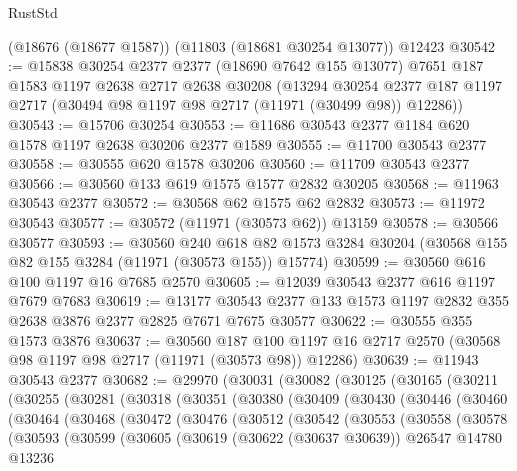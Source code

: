 \begin{lexlean}{RustStd}
\begin{coremodule}
    (@18676 (@18677 @1587))
    (@11803 (@18681 @30254 @13077))
    @12423
@30542 := @15838
    @30254
    @2377
    @2377
    (@18690 @7642 @155 @13077)
    @7651
    @187
    @1583
    @1197
    @2638
    @2717
    @2638
    @30208
    (@13294 @30254 @2377 @187 @1197 @2717 (@30494 @98 @1197 @98 @2717 (@11971 (@30499 @98)) @12286))
@30543 := @15706 @30254
@30553 := @11686 @30543 @2377 @1184 @620 @1578 @1197 @2638 @30206 @2377 @1589
@30555 := @11700 @30543 @2377
@30558 := @30555 @620 @1578 @30206
@30560 := @11709 @30543 @2377
@30566 := @30560 @133 @619 @1575 @1577 @2832 @30205
@30568 := @11963 @30543 @2377
@30572 := @30568 @62 @1575 @62 @2832
@30573 := @11972 @30543
@30577 := @30572 (@11971 (@30573 @62)) @13159
@30578 := @30566 @30577
@30593 := @30560
    @240
    @618
    @82
    @1573
    @3284
    @30204
    (@30568 @155 @82 @155 @3284 (@11971 (@30573 @155)) @15774)
@30599 := @30560 @616 @100 @1197 @16 @7685 @2570
@30605 := @12039 @30543 @2377 @616 @1197 @7679 @7683
@30619 := @13177 @30543 @2377 @133 @1573 @1197 @2832 @355 @2638 @3876 @2377 @2825 @7671 @7675 @30577
@30622 := @30555 @355 @1573 @3876
@30637 := @30560
    @187
    @100
    @1197
    @16
    @2717
    @2570
    (@30568 @98 @1197 @98 @2717 (@11971 (@30573 @98)) @12286)
@30639 := @11943 @30543 @2377
@30682 := @29970
    (@30031
      (@30082
        (@30125
          (@30165
            (@30211
              (@30255
                (@30281
                  (@30318
                    (@30351
                      (@30380
                        (@30409
                          (@30430
                            (@30446
                              (@30460
                                (@30464
                                  (@30468
                                    (@30472
                                      (@30476
                                        (@30512
                                          (@30542
                                            (@30553
                                              (@30558
                                                (@30578
                                                  (@30593
                                                    (@30599
                                                      (@30605
                                                        (@30619
                                                          (@30622 (@30637 @30639))
                                                          @26547
                                                          @14780
                                                          @13236

\end{coremodule}
\end{lexlean}
